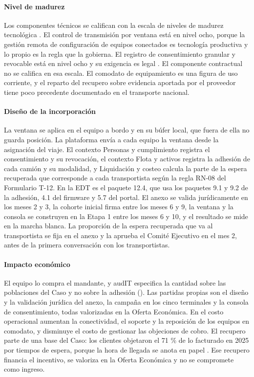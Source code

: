 \paragraph{Nivel de madurez} Los componentes técnicos se califican con la escala de niveles de madurez
tecnológica \parencite{iso16290}. El control de transmisión por ventana está en nivel ocho, porque la
gestión remota de configuración de equipos conectados es tecnología productiva y lo propio es la regla
que la gobierna. El registro de consentimiento granular y revocable está en nivel ocho y su exigencia es
legal \parencite{ley21719}. El componente contractual no se califica en esa escala. El comodato de
equipamiento es una figura de uso corriente, y el reparto del recupero sobre evidencia aportada por el
proveedor tiene poco precedente documentado en el transporte nacional.

\paragraph{Diseño de la incorporación} La ventana se aplica en el equipo a bordo y en su búfer local, que
fuera de ella no guarda posición. La plataforma envía a cada equipo la ventana desde la asignación del
viaje. El contexto Personas y cumplimiento registra el consentimiento y su revocación, el contexto Flota
y activos registra la adhesión de cada camión y su modalidad, y Liquidación y costeo calcula la parte
de la espera recuperada que corresponde a cada transportista según la regla RN-08 del Formulario T-12.
En la EDT es el paquete 12.4, que usa los paquetes 9.1 y 9.2 de la adhesión, 4.1 del firmware y 5.7 del
portal. El anexo se valida jurídicamente en los meses 2 y 3, la cohorte inicial firma entre los meses 6
y 9, la ventana y la consola se construyen en la Etapa 1 entre los meses 6 y 10, y el resultado se mide
en la marcha blanca. La proporción de la espera recuperada que va al transportista se fija en el anexo y
la aprueba el Comité Ejecutivo en el mes 2, antes de la primera conversación con los transportistas.

\paragraph{Impacto económico} El equipo lo compra el mandante, y audIT especifica la cantidad sobre las
poblaciones del Caso y no sobre la adhesión (). Las partidas propias son
el diseño y la validación jurídica del anexo, la campaña en los cinco terminales y la consola de
consentimiento, todas valorizadas en la Oferta Económica. En el costo operacional aumentan la
conectividad, el soporte y la reposición de los equipos en comodato, y disminuye el costo de gestionar
las objeciones de cobro. El recupero parte de una base del Caso: los clientes objetaron el 71 \% de lo
facturado en 2025 por tiempos de espera, porque la hora de llegada se anota en papel . Ese recupero financia el incentivo, se valoriza en la Oferta Económica y no se compromete
como ingreso.

